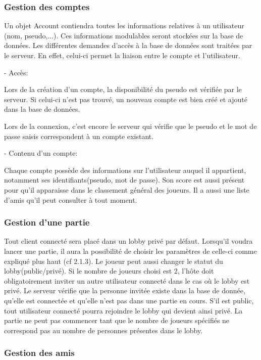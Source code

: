 \documentclass[a4paper,12pt]{article}
\begin{document}
\subsubsection{Gestion des comptes}
Un objet Account contiendra toutes les informations relatives à un utilisateur (nom, pseudo,...). Ces informations modulables seront stockées sur la base de données.
 Les différentes demandes d'accès à la base de données sont traitées par le serveur. En effet, celui-ci permet la liaison entre le compte et l'utilisateur.

- Accès:

Lors de la création d'un compte, la disponibilité du pseudo est vérifiée par le serveur. Si celui-ci n'est pas trouvé, un nouveau compte est bien créé et ajouté dans la base de données.

Lors de la connexion, c'est encore le serveur qui vérifie que le pseudo et le mot de passe saisis correspondent à un compte existant.

- Contenu d'un compte:

Chaque compte possède des informations sur l'utilisateur auquel il appartient, notamment ses identifiants(pseudo, mot de passe). Son score est aussi présent pour qu'il apparaisse dans le classement général des joueurs. Il a aussi une liste d'amis qu'il peut consulter à tout moment.

\subsubsection{Gestion d'une partie}

Tout client connecté sera placé dans un lobby privé par défaut. Lorsqu'il voudra lancer une partie,
il aura la possibilité de choisir les paramètres de celle-ci comme expliqué plus haut (cf 2.1.3). Le joueur peut aussi changer le statut du lobby(public/privé). Si le nombre de joueurs choisi est 2, l'hôte doit obligatoirement inviter un autre utilisateur connecté dans le cas où le lobby est privé.
Le serveur vérifie que la personne invitée existe dans la base de donnée, qu'elle est connectée et qu'elle n'est pas dans une partie en cours.
S'il est public, tout utilisateur connecté pourra rejoindre le lobby qui devient ainsi privé.
La partie ne peut pas commencer tant que le nombre de joueurs spécifiés ne correspond pas au nombre de personnes présentes dans le lobby.

\subsubsection{Gestion des amis}
\end{document}
